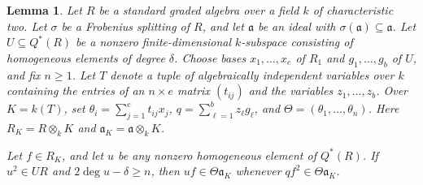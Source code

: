 \documentclass[a4paper,11pt]{amsart}
\newcommand{\kk}{k}
\newtheorem{lemma}[theorem]{Lemma}
\theoremstyle{definition}
\begin{document}
\begin{lemma}\label{lem:frobenius}
Let $R$ be a standard graded algebra over a field $\kk$ of characteristic two. Let $\sigma$ be a Frobenius splitting of $R$, and let $\mathfrak a$ be an ideal with $\sigma(\mathfrak a)\subseteq\mathfrak a$. Let $U\subseteq Q^*(R)$ be a nonzero finite-dimensional $\kk$-subspace consisting of homogeneous elements of degree $\delta$. Choose bases $x_1,\ldots,x_e$ of $R_1$ and $g_1,\ldots,g_b$ of $U$, and fix $n\geq1$. Let $T$ denote a tuple of algebraically independent variables over $\kk$ containing the entries of an $n\times e$ matrix $(t_{ij})$ and the variables $z_1,\ldots,z_b$. Over $K=\kk(T)$, set $\theta_i=\sum_{j=1}^{e}t_{ij}x_j$, $q=\sum_{\ell=1}^{b}z_\ell g_\ell$, and $\Theta=(\theta_1,\ldots,\theta_n)$. Here $R_K=R\otimes_{\kk}K$ and $\mathfrak a_K=\mathfrak a\otimes_{\kk}K$.

Let $f\in R_K$, and let $u$ be any nonzero homogeneous element of $Q^*(R)$. If $u^2\in UR$ and $2\deg u-\delta\geq n$, then $uf\in\Theta \mathfrak a_K$ whenever $qf^2\in\Theta \mathfrak a_K$.
\end{lemma}
\end{document}
